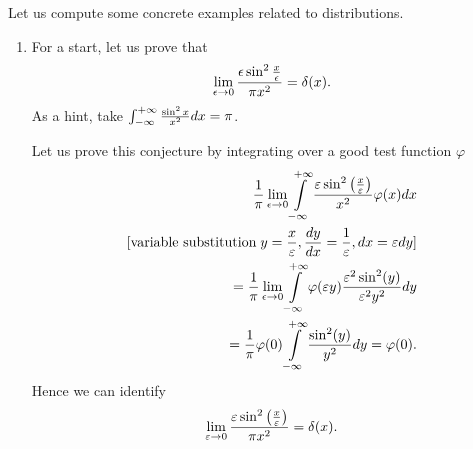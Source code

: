 {
\color{blue}
\bexample

Let us compute some concrete examples related to distributions.
\begin{enumerate}
\item
For a start, let us prove that
\begin{equation}
\lim_{\epsilon \rightarrow 0}{\epsilon \sin^2 \frac{x}{\epsilon}\over \pi
 x^2}= \delta (x).\end{equation}
As a hint, take  $\int_{-\infty}^{+\infty} {\sin^2x\over x^2}dx =\pi $.

Let us prove this conjecture by integrating over a good test function $\varphi$
\begin{equation}
\begin{split}
   {1\over\pi}\lim_{\epsilon \rightarrow 0}\int\limits_{-\infty}^{+\infty}
   {\varepsilon\sin^2\left({x\over\varepsilon}\right)\over x^2} \varphi(x) dx
\\
 \textrm{[variable substitution}\;   y={x\over\varepsilon} , {dy\over dx}={1\over\varepsilon}, dx=\varepsilon dy
\textrm{]}
\\  =
  {1\over\pi}\lim_{\epsilon \rightarrow 0}
   \int\limits_{-\infty}^{+\infty}\varphi(\varepsilon y)
   {\varepsilon^2\sin^2(y)\over \varepsilon^2y^2}dy
\\  =    {1\over\pi}
   \varphi(0)\int\limits_{-\infty}^{+\infty}{\sin^2(y)\over y^2}dy
  =    \varphi(0).
\end{split}
\end{equation}
Hence we can identify
\begin{equation}
   \lim_{\varepsilon \rightarrow 0}{\varepsilon\sin^2 \left({x\over\varepsilon}\right)\over\pi x^2}=\delta(x).
\end{equation}


\end{enumerate}}
